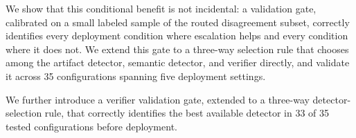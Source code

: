 %




We show that this conditional benefit is not incidental: a validation gate,
calibrated on a small labeled sample of the routed disagreement subset,
correctly identifies every deployment condition where escalation helps and
every condition where it does not. We extend this gate to a three-way
selection rule that chooses among the artifact detector, semantic detector,
and verifier directly, and validate it across 35 configurations spanning
five deployment settings.


We further introduce a verifier validation gate, extended to a three-way
detector-selection rule, that correctly identifies the best available
detector in 33 of 35 tested configurations before deployment.


